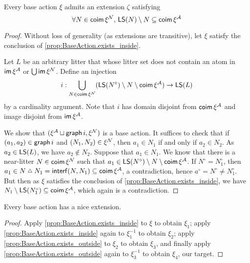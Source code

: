 \begin{proposition}
  \label{prop:BaseAction.exists_outside}
  \leanok
  Every base action \( \xi \) admits an extension \( \zeta \) satisfying
  \[ \forall N \in \operatorname{\mathsf{coim}} \xi^{\mathcal N},\, \operatorname{\mathsf{LS}}(N) \setminus N \subseteq \operatorname{\mathsf{coim}} \xi^{\mathcal A} \]
\end{proposition}
\begin{proof}
  \leanok
  Without loss of generality (as extensions are transitive), let \( \xi \) satisfy the conclusion of \cref{prop:BaseAction.exists_inside}.

  Let \( L \) be an arbitrary litter that whose litter set does not contain an atom in \( \operatorname{\mathsf{im}} \xi^{\mathcal A} \) or \( \bigcup \operatorname{\mathsf{im}} \xi^{\mathcal N} \).
  Define an injection
  \[ i : \bigcup_{N \in \operatorname{\mathsf{coim}} \xi^{\mathcal N}} (\operatorname{\mathsf{LS}}(N^\circ) \setminus N \setminus \operatorname{\mathsf{coim}} \xi^{\mathcal A}) \to \operatorname{\mathsf{LS}}(L) \]
  by a cardinality argument.
  Note that \( i \) has domain disjoint from \( \operatorname{\mathsf{coim}} \xi^{\mathcal A} \) and image disjoint from \( \operatorname{\mathsf{im}} \xi^{\mathcal A} \).

  We show that \( (\xi^{\mathcal A} \sqcup \operatorname{\mathsf{graph}} i, \xi^{\mathcal N}) \) is a base action.
  It suffices to check that if \( (a_1, a_2) \in \operatorname{\mathsf{graph}} i \) and \( (N_1, N_2) \in \xi^{\mathcal N} \), then \( a_1 \in N_1 \) if and only if \( a_2 \in N_2 \).
  As \( a_2 \in \operatorname{\mathsf{LS}}(L) \), we have \( a_2 \notin N_2 \).
  Suppose that \( a_1 \in N_1 \).
  We know that there is a near-litter \( N \in \operatorname{\mathsf{coim}} \xi^{\mathcal N} \) such that \( a_1 \in \operatorname{\mathsf{LS}}(N^\circ) \setminus N \setminus \operatorname{\mathsf{coim}} \xi^{\mathcal A} \).
  If \( N^\circ = N_1^\circ \), then \( a_1 \in N \symmdiff N_1 = \interf(N, N_1) \subseteq \coim \xi^\Atom \), a contradiction, hence \( a^\circ = N^\circ \neq N_1^\circ \).
  But then as \( \xi \) satisfies the conclusion of \cref{prop:BaseAction.exists_inside}, we have \( N_1 \setminus \operatorname{\mathsf{LS}}(N_1^\circ) \subseteq \operatorname{\mathsf{coim}} \xi^{\mathcal A} \), which again is a contradiction.
\end{proof}
\begin{proposition}
  \label{prop:BaseAction.exists_nice}
  \leanok
  Every base action has a nice extension.
\end{proposition}
\begin{proof}
  \leanok
  Apply \cref{prop:BaseAction.exists_inside} to \( \xi \) to obtain \( \xi_1 \); apply \cref{prop:BaseAction.exists_inside} again to \( \xi_1^{-1} \) to obtain \( \xi_2 \); apply \cref{prop:BaseAction.exists_outside} to \( \xi_2 \) to obtain \( \xi_3 \), and finally apply \cref{prop:BaseAction.exists_outside} again to \( \xi_3^{-1} \) to obtain \( \xi_4 \), our target.
\end{proof}

